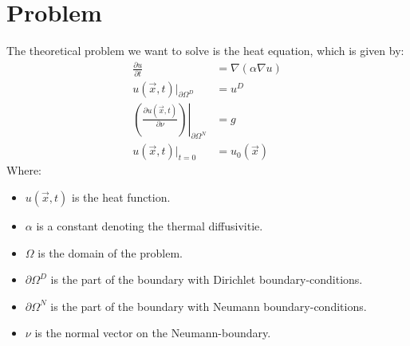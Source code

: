
\section{\label{sec::problem}Problem}
The theoretical problem we want to solve is the heat equation, which is given by:
\begin{align}
	\frac{\partial u}{\partial t} &= \nabla(\alpha\nabla u)\\
	u(\vec{x},t)|_{\partial\Omega^D} &= u^D\\
	\left.\left( \frac{\partial u(\vec{x},t)}{\partial \nu}\right)\right|_{\partial\Omega^N} &= g\\
	u(\vec{x},t)|_{t=0} &=u_0(\vec{x})
\end{align}
Where:
\begin{itemize}
	\item $u(\vec{x},t)$ is the heat function.
	\item $\alpha$ is a constant denoting the thermal diffusivitie.
	\item $\Omega$ is the domain of the problem.
	\item $\partial\Omega^D$ is the part of the boundary with Dirichlet boundary-conditions.
	\item $\partial\Omega^N$ is the part of the boundary with Neumann boundary-conditions.
	\item $\nu$ is the normal vector on the Neumann-boundary.
\end{itemize} 